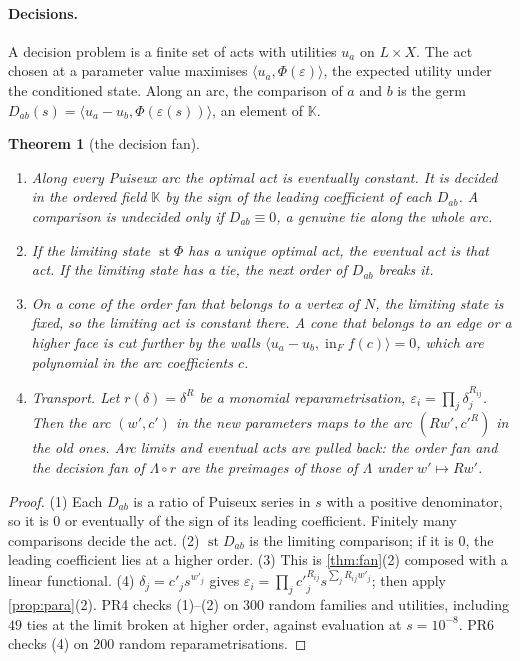 \documentclass[11pt]{article}
\newtheorem{theorem}{Theorem}\newtheorem{proposition}[theorem]{Proposition}\newtheorem{lemma}[theorem]{Lemma}\newtheorem{corollary}[theorem]{Corollary}\newtheorem{conjecture}[theorem]{Conjecture}
\theoremstyle{definition}\newtheorem{definition}[theorem]{Definition}\newtheorem{remark}[theorem]{Remark}\newtheorem{example}[theorem]{Example}
\begin{document}
\paragraph{Decisions.} A decision problem is a finite set of acts with utilities $u_a$ on $L\times X$. The act chosen at a parameter value
maximises $\langle u_a,\Phi(\varepsilon)\rangle$, the expected utility under the conditioned state. Along an arc, the comparison of $a$ and $b$ is
the germ $D_{ab}(s)=\langle u_a-u_b,\Phi(\varepsilon(s))\rangle$, an element of $\mathbb K$.

\begin{theorem}[the decision fan]\label{thm:decisionfan}
\begin{enumerate}
\item[(1)] Along every Puiseux arc the optimal act is eventually constant. It is decided in the ordered field $\mathbb K$ by the sign of the
  leading coefficient of each $D_{ab}$. A comparison is undecided only if $D_{ab}\equiv0$, a genuine tie along the whole arc.
\item[(2)] If the limiting state $\operatorname{st}\Phi$ has a unique optimal act, the eventual act is that act. If the limiting state has a tie, the
  next order of $D_{ab}$ breaks it.
\item[(3)] On a cone of the order fan that belongs to a vertex of $N$, the limiting state is fixed, so the limiting act is constant there. A
  cone that belongs to an edge or a higher face is cut further by the walls $\langle u_a-u_b,\operatorname{in}_F f(c)\rangle=0$, which are polynomial in
  the arc coefficients $c$.
\item[(4)] \emph{Transport.} Let $r(\delta)=\delta^R$ be a monomial reparametrisation, $\varepsilon_i=\prod_j\delta_j^{R_{ij}}$. Then the arc $(w',c')$ in the new parameters
  maps to the arc $(Rw',c'^R)$ in the old ones. Arc limits and eventual acts are pulled back: the order fan and the decision fan of
  $\Lambda\circ r$ are the preimages of those of $\Lambda$ under $w'\mapsto Rw'$.
\end{enumerate}
\end{theorem}

\begin{proof}
(1) Each $D_{ab}$ is a ratio of Puiseux series in $s$ with a positive denominator, so it is $0$ or eventually of the sign of its leading
coefficient. Finitely many comparisons decide the act. (2) $\operatorname{st}D_{ab}$ is the limiting comparison; if it is $0$, the leading coefficient lies
at a higher order. (3) This is \cref{thm:fan}(2) composed with a linear functional. (4) $\delta_j=c'_js^{w'_j}$ gives
$\varepsilon_i=\prod_jc'^{R_{ij}}_js^{\sum_jR_{ij}w'_j}$; then apply \cref{prop:para}(2). PR4 checks (1)--(2) on $300$ random families and utilities,
including $49$ ties at the limit broken at higher order, against evaluation at $s=10^{-8}$. PR6 checks (4) on $200$ random reparametrisations.
\end{proof}
\end{document}
